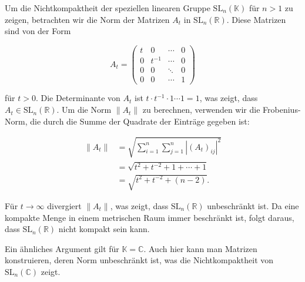 Um die Nichtkompaktheit der speziellen linearen Gruppe $\mathrm{SL}_n(\mathbb{K})$ für $n > 1$ zu zeigen, betrachten wir die Norm der Matrizen $A_t$ in $\mathrm{SL}_n(\mathbb{R})$. Diese Matrizen sind von der Form

\[
A_t = \begin{pmatrix}
t & 0 & \cdots & 0 \\
0 & t^{-1} & \cdots & 0 \\
0 & 0 & \ddots & 0 \\
0 & 0 & \cdots & 1
\end{pmatrix}
\]

für $t > 0$. Die Determinante von $A_t$ ist $t \cdot t^{-1} \cdot 1 \cdots 1 = 1$, was zeigt, dass $A_t \in \mathrm{SL}_n(\mathbb{R})$. Um die Norm $\|A_t\|$ zu berechnen, verwenden wir die Frobenius-Norm, die durch die Summe der Quadrate der Einträge gegeben ist:

\begin{align*}
\|A_t\| &= \sqrt{\sum_{i=1}^{n} \sum_{j=1}^{n} |(A_t)_{ij}|^2} \\
&= \sqrt{t^2 + t^{-2} + 1 + \cdots + 1} \\
&= \sqrt{t^2 + t^{-2} + (n-2)}.
\end{align*}

Für $t \to \infty$ divergiert $\|A_t\|$, was zeigt, dass $\mathrm{SL}_n(\mathbb{R})$ unbeschränkt ist. Da eine kompakte Menge in einem metrischen Raum immer beschränkt ist, folgt daraus, dass $\mathrm{SL}_n(\mathbb{R})$ nicht kompakt sein kann.

Ein ähnliches Argument gilt für $\mathbb{K} = \mathbb{C}$. Auch hier kann man Matrizen konstruieren, deren Norm unbeschränkt ist, was die Nichtkompaktheit von $\mathrm{SL}_n(\mathbb{C})$ zeigt.

